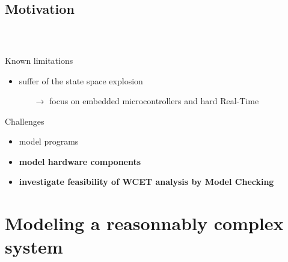 \documentclass[usenames,dvipsnames]{beamer}
\begin{document}
  \subsection{Motivation}
  \begin{frame}
    \frametitle{\subsecname}
    \framesubtitle{~}
    \small
      
    \begin{block}{Known limitations}
      \begin{itemize}
      \item suffer of the state space explosion%
        \begin{itemize}
        \item[$\rightarrow$] focus on embedded microcontrollers and hard Real-Time %
          \end{itemize}
      \end{itemize}
    \end{block}
    
    \vspace{1em}
    \begin{block}{Challenges}
      \begin{itemize}
        \item model programs %
        \item {\bf model hardware components} %
        \item {\bf investigate feasibility of WCET analysis by Model Checking}
      \end{itemize}
    \end{block}
  \end{frame}


  \section{Modeling a reasonnably complex system}
  \begin{frame}
    \tableofcontents[currentsection]
  \end{frame}
\end{document}
